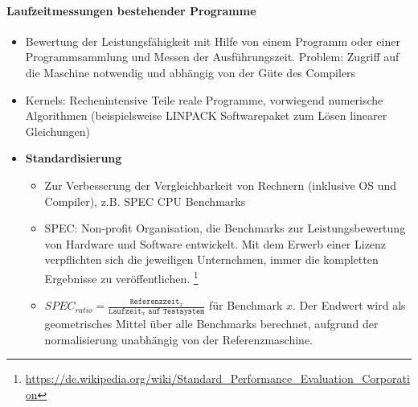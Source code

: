	\paragraph{Laufzeitmessungen bestehender Programme}
		\begin{itemize}
			\item Bewertung der Leistungsfähigkeit mit Hilfe von einem Programm oder einer Programmsammlung und Messen der Ausführungszeit. Problem: Zugriff auf die Maschine notwendig und abhängig von der Güte des Compilers
			\item Kernels: Rechenintensive Teile reale Programme, vorwiegend numerische Algorithmen (beispielsweise LINPACK Softwarepaket zum Lösen linearer Gleichungen)
			\item \textbf{Standardisierung}
			\begin{itemize}
				\item Zur Verbesserung der Vergleichbarkeit von Rechnern (inklusive OS und Compiler), z.B. SPEC CPU Benchmarks
				\item SPEC: Non-profit Organisation, die Benchmarks zur Leistungsbewertung von Hardware und Software entwickelt. Mit dem Erwerb einer Lizenz verpflichten sich die jeweiligen Unternehmen, immer die kompletten Ergebnisse zu veröffentlichen. \footnote{\url{https://de.wikipedia.org/wiki/Standard_Performance_Evaluation_Corporation}}
				\item $SPEC_{ratio} = \frac{\texttt{Referenzzeit}_x}{\texttt{Laufzeit}_x\texttt{ auf Testsystem}}$ für Benchmark $x$. Der Endwert wird als geometrisches Mittel über alle Benchmarks berechnet, aufgrund der normalisierung unabhängig von der Referenzmaschine.
			\end{itemize}
		\end{itemize}

